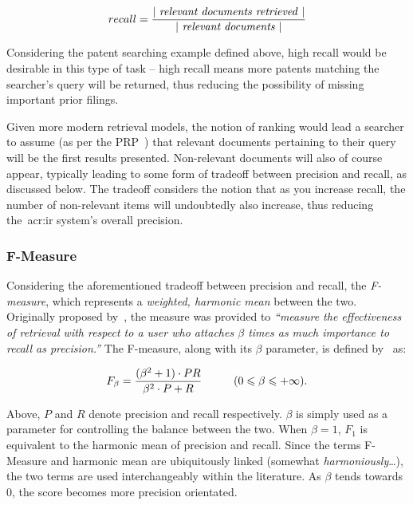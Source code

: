 \begin{equation*}
recall = \frac{|~\text{\emph{relevant documents retrieved}}~|}{|~\text{\emph{relevant documents}}~|}
\end{equation*}

Considering the patent searching example defined above, high recall would be desirable in this type of task -- high recall means more patents matching the searcher's query will be returned, thus reducing the possibility of missing important prior filings.

Given more modern retrieval models, the notion of ranking would lead a searcher to assume (as per the PRP~\citep{robertson1977prp}) that relevant documents pertaining to their query will be the first results presented. Non-relevant documents will also of course appear, typically leading to some form of tradeoff between precision and recall, as discussed below. The tradeoff considers the notion that as you increase recall, the number of non-relevant items will undoubtedly also increase, thus reducing the~\gls{acr:ir} system's overall precision.

\subsubsection{F-Measure}
Considering the aforementioned tradeoff between precision and recall, the \emph{F-measure}, which represents a \emph{weighted, harmonic mean} between the two. Originally proposed by~\cite{rijsbergen1979ir}, the measure was provided to \emph{``measure the effectiveness of retrieval with respect to a user who attaches $\beta$ times as much importance to recall as precision.''} The F-measure, along with its $\beta$ parameter, is defined by~\cite{chinchor1992f_measure} as:

\begin{equation*}
F_\beta = \frac{(\beta^2 + 1)\cdot PR}{\beta^2 \cdot P + R}\hspace{10mm}(0\leqslant\beta\leqslant+\infty).
\end{equation*}

Above, $P$ and $R$ denote precision and recall respectively. $\beta$ is simply used as a parameter for controlling the balance between the two. When $\beta = 1$, $F_1$ is equivalent to the harmonic mean of precision and recall. Since the terms F-Measure and harmonic mean are ubiquitously linked (somewhat \emph{harmoniously}\dots), the two terms are used interchangeably within the literature. As $\beta$ tends towards $0$, the score becomes more precision orientated.

